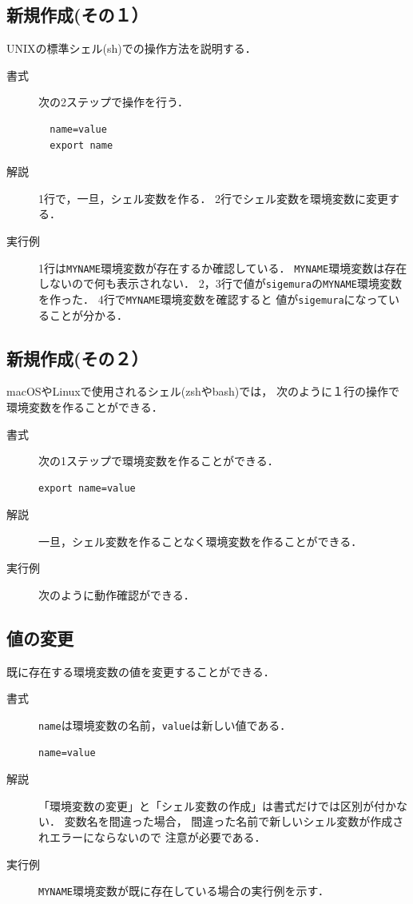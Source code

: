 \subsection{新規作成(その１）}
UNIXの標準シェル(sh)での操作方法を説明する．

\begin{description}
\item[書式] 次の2ステップで操作を行う．
\begin{lstlisting}
  name=value
  export name
\end{lstlisting}
\item[解説]
  1行で，一旦，シェル変数を作る．
  2行でシェル変数を環境変数に変更する．
\item[実行例]
  1行は\texttt{MYNAME}環境変数が存在するか確認している．
  \texttt{MYNAME}環境変数は存在しないので何も表示されない．
  2，3行で値が\texttt{sigemura}の\texttt{MYNAME}環境変数を作った．
  4行で\texttt{MYNAME}環境変数を確認すると
  値が\texttt{sigemura}になっていることが分かる．
  
\end{description}

\subsection{新規作成(その２）}
macOSやLinuxで使用されるシェル(zshやbash)では，
次のように１行の操作で環境変数を作ることができる．

\begin{description}
\item[書式]
  次の1ステップで環境変数を作ることができる．
\begin{lstlisting}[numbers=none]
  export name=value
\end{lstlisting}
\item[解説]
  一旦，シェル変数を作ることなく環境変数を作ることができる．
\item[実行例]
  次のように動作確認ができる．
  
\end{description}

\subsection{値の変更}
既に存在する環境変数の値を変更することができる．

\begin{description}
\item [書式]
  \texttt{name}は環境変数の名前，\texttt{value}は新しい値である．
\begin{lstlisting}[numbers=none]
  name=value
\end{lstlisting}
\item [解説]
  「環境変数の変更」と「シェル変数の作成」は書式だけでは区別が付かない．
  変数名を間違った場合，
  間違った名前で新しいシェル変数が作成されエラーにならないので
  注意が必要である．
\item [実行例]
  \texttt{MYNAME}環境変数が既に存在している場合の実行例を示す．
  
\end{description}

